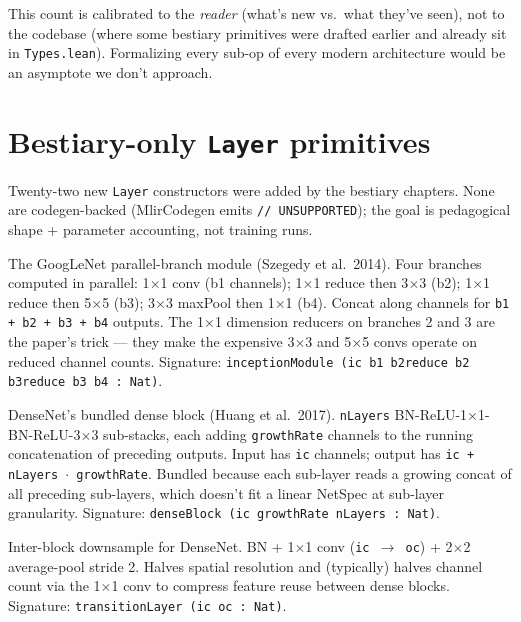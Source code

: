 This count is calibrated to the \emph{reader} (what's new vs.\ what
they've seen), not to the codebase (where some bestiary primitives
were drafted earlier and already sit in \texttt{Types.lean}).
Formalizing every sub-op of every modern architecture would be an
asymptote we don't approach.

\section{Bestiary-only \texttt{Layer} primitives}
\label{sec:bestiary_primitives}

Twenty-two new \texttt{Layer} constructors were added by the bestiary chapters.
None are codegen-backed (MlirCodegen emits \texttt{// UNSUPPORTED}); the
goal is pedagogical shape + parameter accounting, not training runs.

\begin{definition}
  \label{layer:inceptionModule}
  \leanok
  The GoogLeNet parallel-branch module (Szegedy et al.\ 2014). Four
  branches computed in parallel: 1$\times$1 conv (b1 channels); 1$\times$1
  reduce then 3$\times$3 (b2); 1$\times$1 reduce then 5$\times$5 (b3);
  3$\times$3 maxPool then 1$\times$1 (b4). Concat along channels for
  \texttt{b1 + b2 + b3 + b4} outputs. The 1$\times$1 dimension reducers on
  branches 2 and 3 are the paper's trick --- they make the expensive
  3$\times$3 and 5$\times$5 convs operate on reduced channel counts.
  Signature: \texttt{inceptionModule (ic b1 b2reduce b2 b3reduce b3 b4 : Nat)}.
\end{definition}

\begin{definition}
  \label{layer:denseBlock}
  \leanok
  DenseNet's bundled dense block (Huang et al.\ 2017). \texttt{nLayers}
  BN-ReLU-1$\times$1-BN-ReLU-3$\times$3 sub-stacks, each adding
  \texttt{growthRate} channels to the running concatenation of
  preceding outputs. Input has \texttt{ic} channels; output has
  \texttt{ic + nLayers $\cdot$ growthRate}. Bundled because each
  sub-layer reads a growing concat of all preceding sub-layers,
  which doesn't fit a linear NetSpec at sub-layer granularity.
  Signature: \texttt{denseBlock (ic growthRate nLayers : Nat)}.
\end{definition}

\begin{definition}
  \label{layer:transitionLayer}
  \leanok
  Inter-block downsample for DenseNet. BN + 1$\times$1 conv
  (\texttt{ic $\to$ oc}) + 2$\times$2 average-pool stride 2.
  Halves spatial resolution and (typically) halves channel count
  via the 1$\times$1 conv to compress feature reuse between dense
  blocks. Signature: \texttt{transitionLayer (ic oc : Nat)}.
\end{definition}

